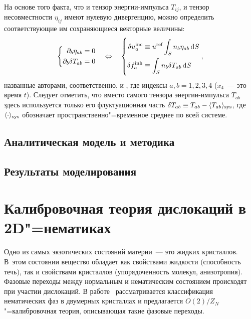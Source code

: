 \documentclass[a4paper, 14pt, titlepage]{extarticle}
\newcommand{\inc}{\textup{inc}}  %
\newcommand{\inh}{\textup{inh}}  %
\newcommand{\refer}{\textup{ref}}%
\newcommand{\sys}{\textup{sys}}  %
\begin{document}
  На основе того факта, что и тензор энергии-импульса $T_{ij}$, и тензор несовместности $\eta_{ij}$
  имеют нулевую дивергенцию, можно определить соответствующие им сохраняющиеся векторные величины:
  \[
    \left\{
      \begin{aligned}[c]
        \partial_b \eta_{ab} &= 0\\
        \partial_b \delta T_{ab} &= 0
      \end{aligned}
    \right.
    \quad \Leftrightarrow \quad
    \left\{
      \begin{aligned}[c]
        \delta u^\inc_a &\equiv u^\refer \int_S n_b \eta_{ab} \dif S \\
        \delta f^\inh_a &\equiv \int_S n_b \delta T_{ab} \dif S
      \end{aligned}
    \right. ,
  \]
  названные авторами, соответственно,  и , где индексы $a,b = 1,2,3,4$ ($x_4$~--- это время $t$). Следует отметить, что вместо самого
  тензора энергии-импульса $T_{ab}$ здесь используется только его флуктуационная часть
  $\delta T_{ab} \equiv T_{ab} - \langle T_{ab} \rangle_\sys$, где $\langle \cdot \rangle_\sys$
  обозначает пространственно"=временное среднее по всей системе.


  \subsection{Аналитическая модель и методика}


  \subsection{Результаты моделирования}


  \section{Калибровочная теория дислокаций в 2D"=нематиках}

  Одно из самых экзотических состояний материи~--- это  жидких кристаллов.
  В~этом состоянии вещество обладает как свойствами жидкости (способность течь), так и свойствами
  кристаллов (упорядоченность молекул, анизотропия). Фазовые переходы между нормальным и
  нематическим состоянием происходят при участии дислокаций. В работе~\cite{liu-nematic}
  рассматривается классификация нематических фаз в двумерных кристаллах и предлагается
  $O(2)/Z_N$"=калибровочная теория, описывающая такие фазовые переходы.
\end{document}
